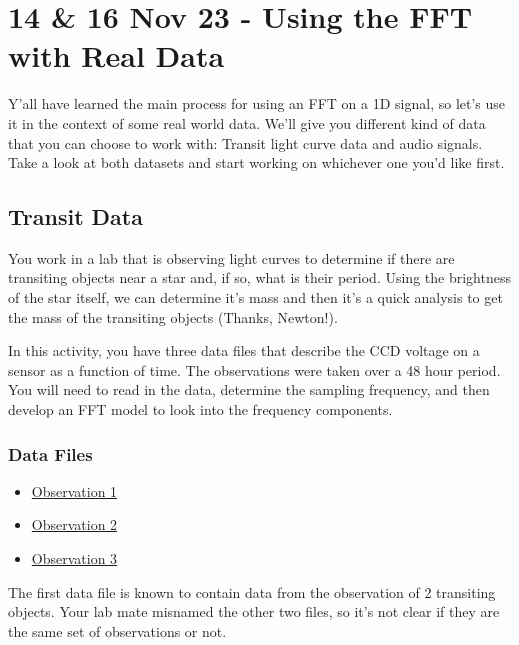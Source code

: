 \section{14 \& 16 Nov 23 - Using the FFT with Real
Data}\label{nov-23---using-the-fft-with-real-data}

Y'all have learned the main process for using an FFT on a 1D signal, so
let's use it in the context of some real world data. We'll give you
different kind of data that you can choose to work with: Transit light
curve data and audio signals. Take a look at both datasets and start
working on whichever one you'd like first.

\subsection{Transit Data}\label{transit-data}

You work in a lab that is observing light curves to determine if there
are transiting objects near a star and, if so, what is their period.
Using the brightness of the star itself, we can determine it's mass and
then it's a quick analysis to get the mass of the transiting objects
(Thanks, Newton!).

In this activity, you have three data files that describe the CCD
voltage on a sensor as a function of time. The observations were taken
over a 48 hour period. You will need to read in the data, determine the
sampling frequency, and then develop an FFT model to look into the
frequency components.

\subsubsection{Data Files}\label{data-files}

\begin{itemize}
\tightlist
\item
  \href{https://raw.githubusercontent.com/dannycab/phy415msu/main/MMIPbook/assets/data/FFT/obs1.csv}{Observation
  1}
\item
  \href{https://raw.githubusercontent.com/dannycab/phy415msu/main/MMIPbook/assets/data/FFT/obs2.csv}{Observation
  2}
\item
  \href{https://raw.githubusercontent.com/dannycab/phy415msu/main/MMIPbook/assets/data/FFT/obs3.csv}{Observation
  3}
\end{itemize}

The first data file is known to contain data from the observation of 2
transiting objects. Your lab mate misnamed the other two files, so it's
not clear if they are the same set of observations or not.

